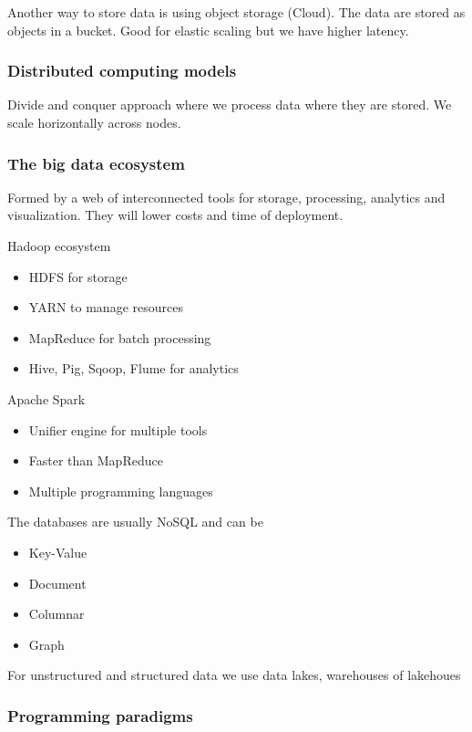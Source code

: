 Another way to store data is using object storage (Cloud). The data are stored as objects in a bucket. Good for elastic scaling but we have higher latency. 

\subsubsection{Distributed computing models}

Divide and conquer approach where we process data where they are stored. We scale horizontally across nodes. 

\subsubsection{The big data ecosystem}

Formed by a web of interconnected tools for storage, processing, analytics and visualization. They will lower costs and time of deployment. 

\vspace{10pt}

Hadoop ecosystem
\begin{itemize}
    \item HDFS for storage
    \item YARN to manage resources
    \item MapReduce for batch processing
    \item Hive, Pig, Sqoop, Flume for analytics
\end{itemize}

Apache Spark

\begin{itemize}
    \item Unifier engine for multiple tools
    \item Faster than MapReduce
    \item Multiple programming languages
\end{itemize}

The databases are usually NoSQL and can be
\begin{itemize}
    \item Key-Value
    \item Document
    \item Columnar
    \item Graph 
\end{itemize}

For unstructured and structured data we use data lakes, warehouses of lakehoues

\subsubsection{Programming paradigms}

